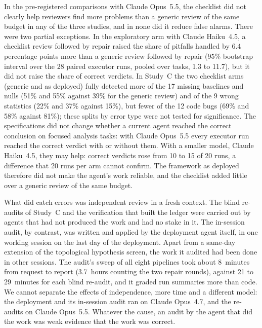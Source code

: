 \documentclass[10pt,letterpaper]{article}
\begin{document}
In the pre-registered comparisons with Claude Opus~5.5, the checklist did
not clearly help reviewers find more problems than a generic review of
the same budget in any of the three studies, and in none did it reduce
false alarms. There were two partial exceptions. In the exploratory arm
with Claude Haiku~4.5, a checklist review followed by repair raised the
share of pitfalls handled by 6.4 percentage points more than a generic
review followed by repair (95\% bootstrap interval over the 28 paired
executor runs, pooled over tasks, 1.3 to 11.7), but it did not raise the
share of correct verdicts. In Study~C the two checklist arms (generic and
as deployed) fully detected more of the 17 missing baselines and nulls
(51\% and 55\% against 39\% for the generic review) and of the 9 wrong
statistics (22\% and 37\% against 15\%), but fewer of the 12 code bugs
(69\% and 58\% against 81\%); these splits by error type were not tested
for significance. The specifications did not change whether a current
agent reached the correct conclusion on focused analysis tasks: with
Claude Opus~5.5 every executor run reached the correct verdict with or
without them. With a smaller model, Claude Haiku~4.5, they may help:
correct verdicts rose from 10 to 15 of 20 runs, a difference that 20 runs
per arm cannot confirm. The framework as deployed therefore did not make
the agent's work reliable, and the checklist added little over a generic
review of the same budget.

What did catch errors was independent review in a fresh context. The
blind re-audits of Study~C and the verification that built the ledger
were carried out by agents that had not produced the work and had no
stake in it. The in-session audit, by contrast, was written and applied
by the deployment agent itself, in one working session on the last day of
the deployment. Apart from a same-day extension of the topological
hypothesis screen, the work it audited had been done in other sessions.
The audit's sweep of all eight pipelines took about
8~minutes from request to report (3.7~hours counting the two repair
rounds), against 21 to 29~minutes for each blind re-audit, and it graded
run summaries more than code. We cannot separate the effects of
independence, more time and a different model: the deployment and its
in-session audit ran on Claude Opus~4.7, and the re-audits on Claude
Opus~5.5. Whatever the cause, an
audit by the agent that did the work was weak evidence that the work was
correct.
\end{document}

